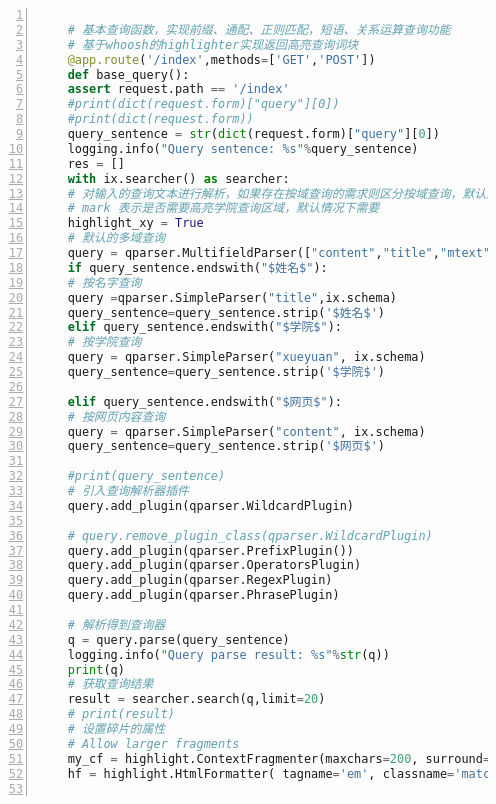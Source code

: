 \documentclass[lang=cn,11pt]{elegantpaper}
\begin{document}
\begin{lstlisting}[language =Python, numbers=left, 
numberstyle=\tiny,keywordstyle=\color{blue!70},
commentstyle=\color{red!50!green!50!blue!50},frame=shadowbox,
rulesepcolor=\color{red!20!green!20!blue!20},basicstyle=\ttfamily]
	
	# 基本查询函数，实现前缀、通配、正则匹配，短语、关系运算查询功能
	# 基于whoosh的highlighter实现返回高亮查询词块
	@app.route('/index',methods=['GET','POST'])
	def base_query():
	assert request.path == '/index'
	#print(dict(request.form)["query"][0])
	#print(dict(request.form))
	query_sentence = str(dict(request.form)["query"][0])
	logging.info("Query sentence: %s"%query_sentence)
	res = []
	with ix.searcher() as searcher:
	# 对输入的查询文本进行解析，如果存在按域查询的需求则区分按域查询，默认采用多属性查询模式
	# mark 表示是否需要高亮学院查询区域，默认情况下需要
	highlight_xy = True
	# 默认的多域查询
	query = qparser.MultifieldParser(["content","title","mtext","xueyuan"], ix.schema)
	if query_sentence.endswith("$姓名$"):
	# 按名字查询
	query =qparser.SimpleParser("title",ix.schema)
	query_sentence=query_sentence.strip('$姓名$')
	elif query_sentence.endswith("$学院$"):
	# 按学院查询
	query = qparser.SimpleParser("xueyuan", ix.schema)
	query_sentence=query_sentence.strip('$学院$')
	
	elif query_sentence.endswith("$网页$"):
	# 按网页内容查询
	query = qparser.SimpleParser("content", ix.schema)
	query_sentence=query_sentence.strip('$网页$')
	
	#print(query_sentence)
	# 引入查询解析器插件
	query.add_plugin(qparser.WildcardPlugin)
	
	# query.remove_plugin_class(qparser.WildcardPlugin)
	query.add_plugin(qparser.PrefixPlugin())
	query.add_plugin(qparser.OperatorsPlugin)
	query.add_plugin(qparser.RegexPlugin)
	query.add_plugin(qparser.PhrasePlugin)
	
	# 解析得到查询器
	q = query.parse(query_sentence)
	logging.info("Query parse result: %s"%str(q))
	print(q)
	# 获取查询结果
	result = searcher.search(q,limit=20)
	# print(result)
	# 设置碎片的属性
	# Allow larger fragments
	my_cf = highlight.ContextFragmenter(maxchars=200, surround=30)
	hf = highlight.HtmlFormatter( tagname='em', classname='match', termclass='term')
	

\end{lstlisting}
\end{document}

